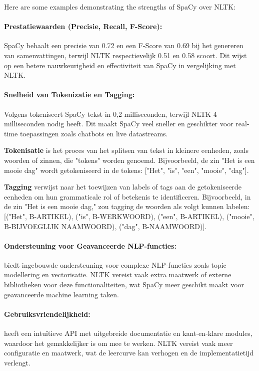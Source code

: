 Here are some examples demonstrating the strengths of SpaCy over NLTK:

\paragraph{Prestatiewaarden (Precisie, Recall, F-Score):} SpaCy behaalt een precisie van 0.72 en een F-Score van 0.69 bij het genereren van samenvattingen, terwijl NLTK respectievelijk 0.51 en 0.58 scoort. Dit wijst op een betere nauwkeurigheid en effectiviteit van SpaCy in vergelijking met NLTK.

\paragraph{Snelheid van Tokenizatie en Tagging:} Volgens \textcite{Saadani_2024} tokeniseert SpaCy tekst in 0,2 milliseconden, terwijl NLTK 4 milliseconden nodig heeft. Dit maakt SpaCy veel sneller en geschikter voor real-time toepassingen zoals chatbots en live datastreams.

\textbf{Tokenisatie} is het proces van het splitsen van tekst in kleinere eenheden, zoals woorden of zinnen, die "tokens" worden genoemd. Bijvoorbeeld, de zin "Het is een mooie dag" wordt getokeniseerd in de tokens: ["Het", "is", "een", "mooie", "dag"].

\textbf{Tagging} verwijst naar het toewijzen van labels of tags aan de getokeniseerde eenheden om hun grammaticale rol of betekenis te identificeren. Bijvoorbeeld, in de zin "Het is een mooie dag," zou tagging de woorden als volgt kunnen labelen: [("Het", B-ARTIKEL), ("is", B-WERKWOORD), ("een", B-ARTIKEL), ("mooie", B-BIJVOEGLIJK NAAMWOORD), ("dag", B-NAAMWOORD)].

\paragraph{Ondersteuning voor Geavanceerde NLP-functies:} \autocite{spacyff} biedt ingebouwde ondersteuning voor complexe NLP-functies zoals topic modellering en vectorisatie. NLTK vereist vaak extra maatwerk of externe bibliotheken voor deze functionaliteiten, wat SpaCy meer geschikt maakt voor geavanceerde machine learning taken.

\paragraph{Gebruiksvriendelijkheid:} \autocite{spacyff} heeft een intuïtieve API met uitgebreide documentatie en kant-en-klare modules, waardoor het gemakkelijker is om mee te werken. NLTK vereist vaak meer configuratie en maatwerk, wat de leercurve kan verhogen en de implementatietijd verlengt.

